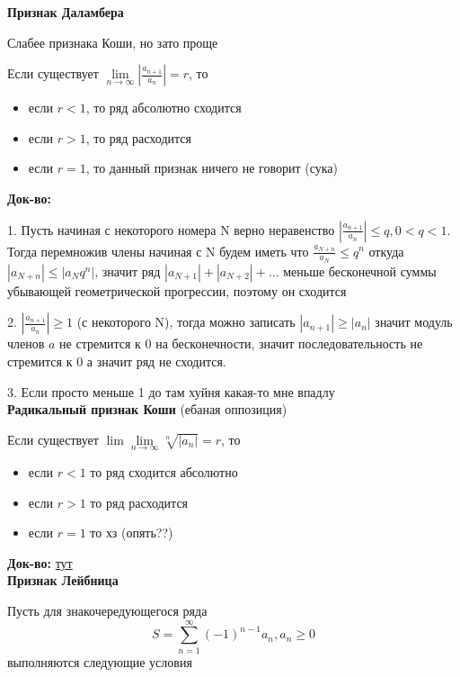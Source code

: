 \documentclass{article}
\begin{document}
{\bf Признак Даламбера}

Слабее признака Коши, но зато проще

Если существует $\lim\limits_{n \rightarrow \infty}|\frac{a_{n + 1}}{a_n}| = r$, то 

\begin{itemize}
	\item если $r < 1$, то ряд абсолютно сходится
	\item если $r > 1$, то ряд расходится
	\item если $r = 1$, то данный признак ничего не говорит (сука)
\end{itemize}

{\bf Док-во:}

1. Пусть начиная с некоторого номера N верно неравенство $|\frac{a_{n+1}}{a_n}| \le q, 0 < q < 1$. Тогда перемножив члены начиная с N будем иметь что $\frac{a_{N+n}}{a_N} \le q^n$ откуда $|a_{N+n}| \le |a_{N}q^n|$, значит ряд $|a_{N+1}| + |a_{N+2}| + ...$ меньше бесконечной суммы убывающей геометрической прогрессии, поэтому он сходится

2. $|\frac{a_{n + 1}}{a_n}| \ge 1$ (с некоторого N), тогда можно записать $|a_{n+1}| \ge |a_n|$ значит модуль членов $a$ не стремится к 0 на бесконечности, значит последовательность не стремится к 0 а значит ряд не сходится.

3. Если просто меньше 1 до там хуйня какая-то мне впадлу
\\

{\bf Радикальный признак Коши} (ебаная оппозиция)

Если существует $\lim\lim\limits_{n \rightarrow \infty} \sqrt[n]{|a_n|} = r$, то

\begin{itemize}
	\item если $r < 1$ то ряд сходится абсолютно
	\item если $r > 1$ то ряд расходится
	\item если $r = 1$ то хз (опять??)
\end{itemize}

{\bf Док-во:} \href{https://ru.wikipedia.org/wiki/%D0%A0%D0%B0%D0%B4%D0%B8%D0%BA%D0%B0%D0%BB%D1%8C%D0%BD%D1%8B%D0%B9_%D0%BF%D1%80%D0%B8%D0%B7%D0%BD%D0%B0%D0%BA_%D0%9A%D0%BE%D1%88%D0%B8}{тут}
\\

{\bf Признак Лейбница}

Пусть для знакочередующегося ряда $$S = \sum\limits_{n=1}^{\infty}(-1)^{n-1}a_n, a_n \ge 0$$
выполняются следующие условия
\end{document}
